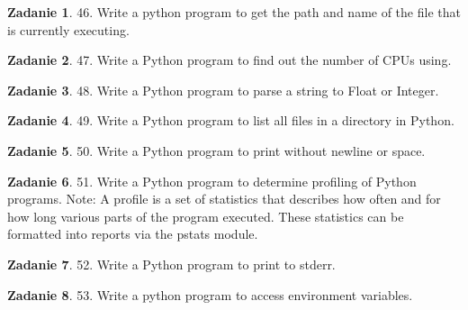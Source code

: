 \documentclass[11pt]{article}
\theoremstyle{definition}
\newtheorem{zadanie}{Zadanie}
\begin{document}
\begin{zadanie}


46. Write a python program to get the path and name of the file that is currently executing. 

\end{zadanie}

\begin{zadanie}


47. Write a Python program to find out the number of CPUs using. 

\end{zadanie}

\begin{zadanie}


48. Write a Python program to parse a string to Float or Integer. 

\end{zadanie}

\begin{zadanie}


49. Write a Python program to list all files in a directory in Python. 

\end{zadanie}

\begin{zadanie}


50. Write a Python program to print without newline or space. 

\end{zadanie}

\begin{zadanie}


51. Write a Python program to determine profiling of Python programs. 
Note: A profile is a set of statistics that describes how often and for how long various parts of the program executed. These statistics can be formatted into reports via the pstats module.

\end{zadanie}

\begin{zadanie}


52. Write a Python program to print to stderr. 

\end{zadanie}

\begin{zadanie}


53. Write a python program to access environment variables. 

\end{zadanie}
\end{document}
